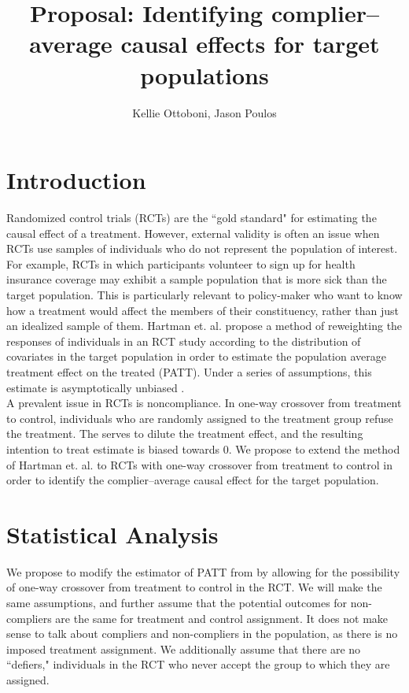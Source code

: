 \documentclass{article}
\title{Proposal: Identifying complier--average causal effects for target populations}
\author{Kellie Ottoboni, Jason Poulos}
\begin{document}
\maketitle

\section{Introduction}
Randomized control trials (RCTs) are the ``gold standard" for estimating the causal effect of a treatment.  However, external validity is often an issue when RCTs use samples of individuals who do not represent the population of interest.  For example, RCTs in which participants volunteer to sign up for health insurance coverage may exhibit a sample population that is more sick than the target population.  This is particularly relevant to policy-maker who want to know how a treatment would affect the members of their constituency, rather than just an idealized sample of them.  Hartman et. al. propose a method of reweighting the responses of individuals in an RCT study according to the distribution of covariates in the target population in order to estimate the population average treatment effect on the treated (PATT).  Under a series of assumptions, this estimate is asymptotically unbiased \cite{Hartman}. \\

A prevalent issue in RCTs is noncompliance.  In one-way crossover from treatment to control, individuals who are randomly assigned to the treatment group refuse the treatment.  The serves to dilute the treatment effect, and the resulting intention to treat estimate is biased towards $0$.  We propose to extend the method of Hartman et. al. to RCTs with one-way crossover from treatment to control in order to identify the complier--average causal effect for the target population.

\section{Statistical Analysis}
We propose to modify the estimator of PATT from \cite{Hartman} by allowing for the possibility of one-way crossover from treatment to control in the RCT.  We will make the same assumptions, and further assume that the potential outcomes for non-compliers are the same for treatment and control assignment.  It does not make sense to talk about compliers and non-compliers in the population, as there is no imposed treatment assignment.  We additionally assume that there are no ``defiers," individuals in the RCT who never accept the group to which they are assigned. \\
\end{document}
